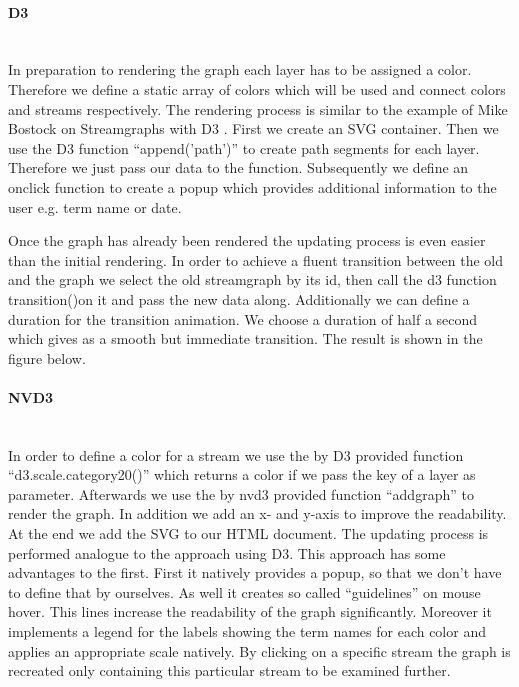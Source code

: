 \documentclass{llncs}
\newcommand{\myparagraph}[1]{\paragraph{#1}\mbox{}\\}
\begin{document}

\myparagraph{D3}
In preparation to rendering the graph each layer has to be assigned a color. Therefore we define a static array of colors which will be used and connect colors and streams respectively.
The rendering process is similar to the example of Mike Bostock on Streamgraphs with D3 . First we create an SVG container. Then we use the D3 function  ``append('path')'' to create path segments for each layer. Therefore we just pass our data to the function. Subsequently we define an onclick function to create a popup which provides additional information to the user e.g. term name or date.

Once the graph has already been rendered the updating process is even easier than the initial rendering. In order to achieve a fluent transition between the old and the graph we select the old streamgraph by its id, then call the d3 function \grqq transition()\grqq  on it and pass the new data along. Additionally we can define a duration for the transition animation. We choose a duration of half a second which gives as a smooth but immediate transition. The result is shown in the figure below.


\myparagraph{NVD3}
In order to define a color for a stream we use the by D3 provided function ``d3.scale.category20()'' which returns a color if we pass the key of a layer as parameter.
Afterwards we use the by nvd3 provided function ``addgraph'' to render the graph. In addition we add an x- and y-axis to improve the readability. At the end we add the SVG to our HTML document.
The updating process is performed analogue to the approach using D3.
This approach has some advantages to the first. First it natively provides a popup, so that we don't have to define that by ourselves. As well it creates so called ``guidelines'' on mouse hover. This lines increase the readability of the graph significantly. Moreover it implements a legend for the labels showing the term names for each color and applies an appropriate scale natively. By clicking on a specific stream the graph is recreated only containing this particular stream to be examined further.
\end{document}
